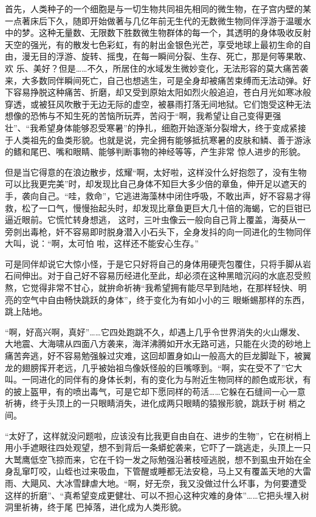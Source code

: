 \documentclass{article}
\begin{document}
首先，人类种子的一个细胞是与一切生物共同祖先相同的微生物，在子宫内壁的某一点著床后下久，随即开始做著与几亿年前无生代的无数微生物同伴浮游于温暖水中的梦。这种无量数、无限数下胜数微生物群体的每一个，其透明的身体吸收反射天空的强光，有的散发七色彩虹，有的射出金银色光芒，享受地球上最初生命的自由，漫无目的浮游、旋转、摇曳，在每一瞬间分裂、生存、死亡，那是何等果敢、欢
\newpage
乐、美好？但是……不久，所居住的水域发生微妙变化，无法形容的莫大痛苦袭来，大多数同伴瞬间死亡，自己也想逃生，可是全身却被痛苦束缚而无法动弹。好下容易挣脱这种痛苦、折磨，却又受到原始太阳如烈火般追迫，苍白月光如寒冰般穿透，或被狂风吹散于无边无际的虚空，被暴雨打落无间地狱。它们饱受这种无法想像的恐怖与不知生死的苦恼所玩弄，苦闷于“啊，我希望让自己变得更强壮”、“我希望身体能够忍受寒暑”的挣扎，细胞开始逐渐分裂增大，终于变成紧接于人类祖先的鱼类形貌。也就是说，完全拥有能够抵抗寒暑的皮肤和鳞、善于游泳的鳍和尾巴、嘴和眼睛、能够判断事物的神经等等，产生非常
惊人进步的形貌。 

但是当它得意的在浪边散步，炫耀“啊，太好啦，这样没什么好抱怨了，没有生物可以比我更完美”时，却发现比自己身体不知巨大多少倍的章鱼，伸开足以遮天的手，袭向自己。“哇，救命”，它逃进海藻林中闭住呼吸，不敢出声，好不容易才得救，松了一口气，慢慢抬起头时，却发现比章鱼更巨大几十倍的海蝎，它的巨钳已逼近眼前。它慌忙转身想逃，
\newpage
这时，三叶虫像云一般向自己背上覆盖，海葵从一旁剠出毒枪，奸不容易即时脱身潜入小石头下，全身发抖的向一同进化的生物同伴大叫，说：“啊，太可怕
啦，这样还不能安心生存。” 

可是同伴却说它大惊小怪，于是它只好将自己的身体用硬壳包覆住，只将手脚从岩石间伸出。对于自己好不容易历经进化至此，却必须在这种黑暗沉闷的水底忍受煎熬，它觉得非常不甘心，就拚命祈祷“我希望拥有能尽早到陆地，在那样轻快、明亮的空气中自由畅快跳跃的身体”，终于变化为有如小小的三
眼蜥蜴那样的东西，跳上陆地。 

“啊，好高兴啊，真好”……它四处跑跳不久，却遇上几乎令世界消失的火山爆发、大地震、大海啸从四面八方袭来，海洋沸腾如开水无路可逃，只能在火烫的砂地上痛苦奔逃，好不容易勉强躲过灾难，这回却置身如山一般高大的巨龙脚趾下，被翼龙的翅膀挥开老远，几乎被始祖鸟像妖怪般的巨嘴啄到。“啊，实在受不了”它大叫。一同进化的同伴有的身体长刺，有的变化为与附近生物同样的颜色或形状，有
\newpage
的披上盔甲，有的喷出毒气，可是它却下愿同样的苟活……它躲在石缝间一心一意祈祷，终于头顶上的一只眼睛消失，进化成两只眼睛的猿猴形貌，跳跃于树
梢之间。 

“太好了，这样就没问题啦，应该没有比我更自由自在、进步的生物”，它在树梢上用小手遮眼往四处观望，想不到背后一条蟒蛇袭来，它吓了一跳逃走，头顶上一只大鹫鹰低空飞掠而来，它在千钧一发之际勉强沿著枝哑逃脱，想不到虱虫开始在全身乱窜叮咬，山蛭也过来吸血，下管醒或睡都无法安稳，马上又有覆盖天地的大雷雨、大飓风、大冰雪肆虐大地。“啊，好无奈，我又没做过什么坏事，为何要遭受这样的折磨”、“真希望变成更健壮、可以不担心这种灾难的身体”……它把头埋入树洞里祈祷，终于尾
巴掉落，进化成为人类形貌。 
\end{document}
